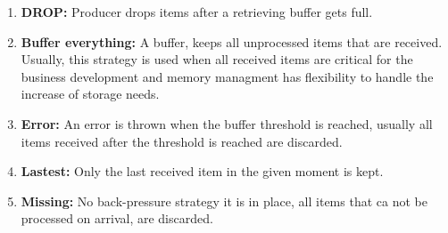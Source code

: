 	\begin{enumerate}
		\item \textbf{DROP:} Producer drops items after a retrieving buffer gets full.
		\item \textbf{Buffer everything:} A buffer, keeps all unprocessed items that are received. Usually, this strategy is used when all received items are critical for the business development and memory managment has flexibility to handle the increase of storage needs.
		\item \textbf{Error:} An error is thrown when the buffer threshold is reached, usually all items received after the threshold is reached are discarded.
		\item \textbf{Lastest:} Only the last received item in the given moment is kept.
		\item \textbf{Missing:} No back-pressure strategy it is in place, all items that ca not be processed on arrival, are discarded.
	\end{enumerate}
	\clearpage
